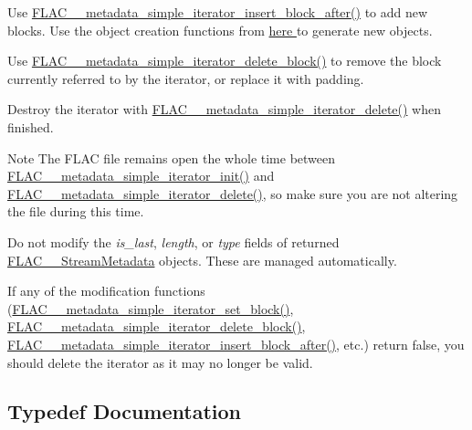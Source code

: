 \begin{DoxyItemize}
\item Use \hyperlink{group__flac__metadata__level1_ga1239ccc5ae1dc3f7cb0e1a61707fafc6}{F\+L\+A\+C\+\_\+\+\_\+metadata\+\_\+simple\+\_\+iterator\+\_\+insert\+\_\+block\+\_\+after()} to add new blocks. Use the object creation functions from \hyperlink{group__flac__metadata__object}{here } to generate new objects.
\item Use \hyperlink{group__flac__metadata__level1_gaf0a1823f95f8097f0d2ff3f67ae30a88}{F\+L\+A\+C\+\_\+\+\_\+metadata\+\_\+simple\+\_\+iterator\+\_\+delete\+\_\+block()} to remove the block currently referred to by the iterator, or replace it with padding.
\item Destroy the iterator with \hyperlink{group__flac__metadata__level1_ga46e64734300a022bb9616b26228b0348}{F\+L\+A\+C\+\_\+\+\_\+metadata\+\_\+simple\+\_\+iterator\+\_\+delete()} when finished.
\end{DoxyItemize}

\begin{DoxyNote}{Note}
The F\+L\+AC file remains open the whole time between \hyperlink{group__flac__metadata__level1_ga2a055cca4e6e06ae62517c8b0fa6e8a3}{F\+L\+A\+C\+\_\+\+\_\+metadata\+\_\+simple\+\_\+iterator\+\_\+init()} and \hyperlink{group__flac__metadata__level1_ga46e64734300a022bb9616b26228b0348}{F\+L\+A\+C\+\_\+\+\_\+metadata\+\_\+simple\+\_\+iterator\+\_\+delete()}, so make sure you are not altering the file during this time.

Do not modify the {\itshape is\+\_\+last}, {\itshape length}, or {\itshape type} fields of returned \hyperlink{struct_f_l_a_c_____stream_metadata}{F\+L\+A\+C\+\_\+\+\_\+\+Stream\+Metadata} objects. These are managed automatically.

If any of the modification functions (\hyperlink{group__flac__metadata__level1_ga7d1ceb2db292c968ae6ac18ecb15c356}{F\+L\+A\+C\+\_\+\+\_\+metadata\+\_\+simple\+\_\+iterator\+\_\+set\+\_\+block()}, \hyperlink{group__flac__metadata__level1_gaf0a1823f95f8097f0d2ff3f67ae30a88}{F\+L\+A\+C\+\_\+\+\_\+metadata\+\_\+simple\+\_\+iterator\+\_\+delete\+\_\+block()}, \hyperlink{group__flac__metadata__level1_ga1239ccc5ae1dc3f7cb0e1a61707fafc6}{F\+L\+A\+C\+\_\+\+\_\+metadata\+\_\+simple\+\_\+iterator\+\_\+insert\+\_\+block\+\_\+after()}, etc.) return {\ttfamily false}, you should delete the iterator as it may no longer be valid. 
\end{DoxyNote}


\subsection{Typedef Documentation}
\mbox{\label{group__flac__metadata__level1_ga6accccddbb867dfc2eece9ee3ffecb3a}} 
